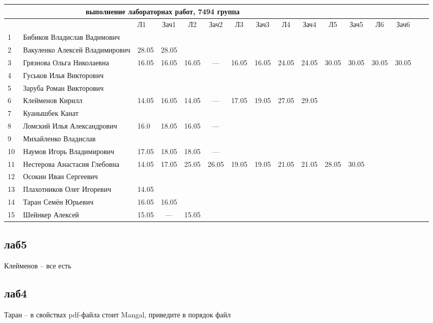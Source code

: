 \documentclass[a4paper,11pt]{article}
\begin{document}
\newpage
{}
\recalctypearea

%
\hspace{-6.1cm} %
\begin{tabular}{l|llccccccccccccc}
\multicolumn{10}{c}{выполнение лабораторнах работ, 7494 группа} \\
\toprule
&&Л1&Зач1& Л2&Зач2& Л3&Зач3& Л4&Зач4& Л5&Зач5& Л6&Зач6&\\ 
\midrule
1\,&Бибиков Владислав Вадимович    &&&&&&&&\\
2\,&Вакуленко Алексей Владимирович &28.05&28.05&&&&&&\\
3\,&Грязнова Ольга Николаевна      &16.05&16.05&16.05& --- &16.05&16.05&24.05&24.05&30.05&30.05&30.05&30.05\\
4\,&Гуськов Илья Викторович        &&&&&&&&\\
5\,&Заруба Роман Викторович        &&&&&&&&\\
\midrule
6\,&Клейменов Кирилл               &14.05&16.05&14.05& --- &17.05&19.05&27.05&29.05\\
7\,&Куанышбек Канат                &&&&&&&&\\
8\,&Ломский Илья Александрович     &16.0&18.05&16.05& --- &&&&\\
9\,&Михайленко Владислав           &&&&&&&&\\
10\,&Наумов Игорь Владимирович     &17.05&18.05&18.05& --- &&&&\\
\midrule
	11\,&Нестерова Анастасия Глебовна  &14.05&17.05&25.05&26.05&19.05&19.05&21.05&21.05&28.05&30.05\\
12\,&Осокин Иван Сергеевич         &&&&&&&&\\
13\,&Плахотников Олег Игоревич     &14.05&&&&&&&\\
14\,&Таран Семён Юрьевич           &16.05&16.05&&&&&&\\
15\,&Шейнкер Алексей               &15.05& --- &15.05&&&&&\\

\bottomrule
\end{tabular}

\newpage
{}
\recalctypearea
\subsection*{лаб5}
Клейменов -- все есть

\subsection*{лаб4}
Таран -- в свойствах pdf-файла стоит Mangal, приведите в порядок файл
\end{document}
